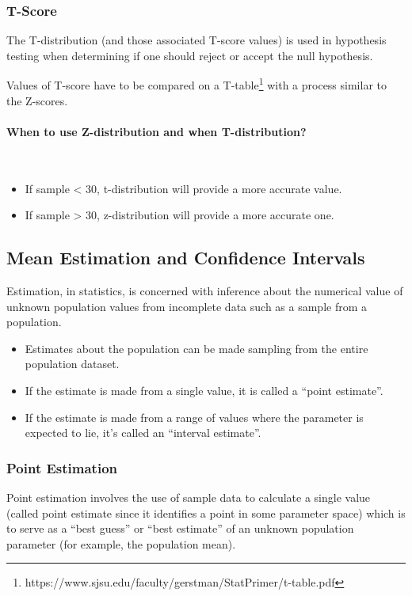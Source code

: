 \documentclass{article}
\begin{document}
\subsubsection{T-Score}
The T-distribution (and those associated T-score values) is used in hypothesis testing
 when determining if one should reject or accept the null hypothesis.

Values of T-score have to be compared on a T-table\footnote{https://www.sjsu.edu/faculty/gerstman/StatPrimer/t-table.pdf} with a process similar to the Z-scores.

\paragraph{When to use Z-distribution and when T-distribution?}\mbox{} \\
\begin{itemize}
    \item If sample < 30, t-distribution will provide a more accurate value.
    \item If sample > 30, z-distribution will provide a more accurate one.
\end{itemize}

\subsection{Mean Estimation and Confidence Intervals}
 Estimation, in statistics, is concerned with inference about the numerical value of unknown population values from incomplete data such as a sample from a population.

\begin{itemize}
    \item Estimates about the population can be made sampling from the entire population dataset.
    \item If the estimate is made from a single value, it is called a “point estimate”.
    \item If the estimate is made from a range of values where the parameter is expected to lie, it’s called an “interval estimate”.
\end{itemize} 

\subsubsection{Point Estimation}
Point estimation involves the use of sample data to calculate a single value (called point estimate since it identifies a point in some parameter space) which is to serve as a “best guess” or “best estimate” of an unknown population parameter (for example, the population mean). 
\end{document}
